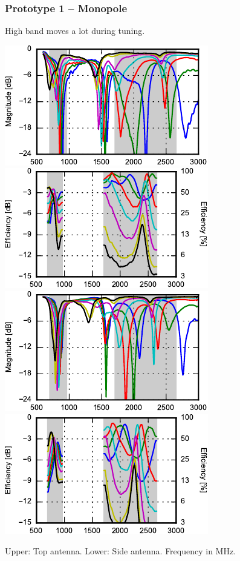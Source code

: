 \def\legendfooter{\scriptsize{Upper: Top antenna. Lower: Side antenna. Frequency in MHz.}}
\begin{frame}
    \frametitle{Prototype 1 -- Monopole}
    High band moves a lot during tuning.
    \begin{center}
        \includegraphics{img/soren/proto/design1lt/s11.pdf}
        \includegraphics{img/soren/proto/design1lt/efftop.pdf}\\
        \includegraphics{img/soren/proto/design1lt/s22.pdf}
        \includegraphics{img/soren/proto/design1lt/effside.pdf}
    \end{center}
    \legendfooter
\end{frame}

